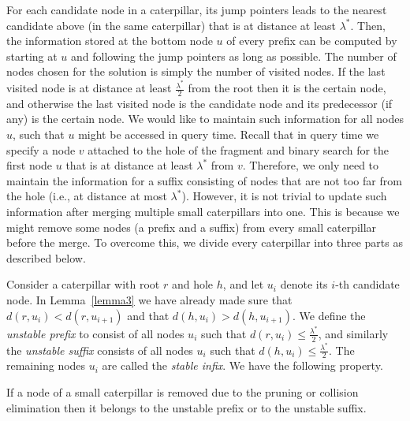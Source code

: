 \documentclass[a4paper,UKenglish]{lipics-v2016}
\theoremstyle{plain}
\begin{document}
\medskip {} For each candidate node in a caterpillar, its jump pointers leads to the nearest
candidate above (in the same caterpillar) that is at distance at least $\lambda^{*}$. Then, the information
stored at the bottom node $u$ of every prefix can be computed by starting at $u$ and following
the jump pointers as long as possible. The number of nodes chosen for the solution is simply the number of visited
nodes. If the last visited node is at distance at least $\frac{\lambda^{*}}{2}$ from the root then it is
the certain node, and otherwise the last visited node is the candidate node and its predecessor
(if any) is the certain node. We would like to maintain such information for all nodes $u$,
such that $u$ might be accessed in query time. Recall that in query time we specify
a node $v$ attached to the hole of the fragment and binary search for the first node $u$ that
is at distance at least $\lambda^{*}$ from $v$. Therefore, we only need to maintain the information
for a suffix consisting of nodes that are not too far from the hole (i.e., at distance at most $\lambda^{*}$). However, it is not
 trivial to update such information after merging multiple small caterpillars into
one. This is because we might remove some nodes (a prefix and a suffix)
from every small caterpillar before the merge. To overcome this, we divide every caterpillar into
three parts as described below.

\medskip {} 
Consider a caterpillar with root $r$ and hole $h$, and let $u_{i}$ denote its $i$-th candidate node. In Lemma~\ref{lemma3} we have already made sure that $d(r,u_{i}) < d(r,u_{i+1})$
and that $d(h,u_{i}) > d(h,u_{i+1})$. We define the \emph{unstable prefix} to
consist of all nodes $u_{i}$ such that $d(r,u_{i})\leq \frac{\lambda^{*}}{2}$, and similarly the
\emph{unstable suffix} consists of all nodes $u_{i}$ such that $d(h,u_{i})\leq \frac{\lambda^{*}}{2}$.
The remaining nodes $u_{i}$ are called the \emph{stable infix}.  We have the following property.

\begin{lemma}
\label{stable infix}
If a node of a small caterpillar is removed due to the pruning or collision elimination then it
belongs to the unstable prefix or to the unstable suffix.
\end{lemma}
\end{document}
